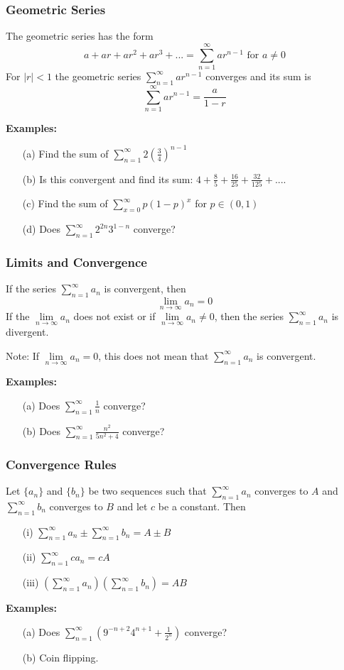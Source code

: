 \documentclass{beamer}
\begin{document}
\begin{frame}
\frametitle{Geometric Series}
The geometric series has the form
$$a + ar + ar^2 + ar^3 +... = \sum_{n=1}^\infty ar^{n-1} \mbox{ for } a\neq 0$$
For $|r|<1$ the geometric series $\sum_{n=1}^\infty ar^{n-1}$ converges and its sum is 
$$\sum_{n=1}^\infty ar^{n-1} =\frac{a}{1-r}$$

\vspace{6pt}
\textbf{Examples:}
\begin{itemize}
	\item[(a)] Find the sum of $\sum_{n=1}^\infty 2(\frac{3}{4})^{n-1}$
	\item[(b)] Is this convergent and find its sum: $4+\frac{8}{5} + \frac{16}{25} + \frac{32}{125} + ...$.
	\item[(c)] Find the sum of $\sum_{x=0}^\infty p(1-p)^x$ for $p \in (0,1)$
	\item[(d)] Does $\sum_{n=1}^\infty 2^{2n} 3^{1-n}$ converge?
\end{itemize}
\end{frame}

\begin{frame}
\frametitle{Limits and Convergence}

\begin{theorem}
	If the series $\sum_{n=1}^\infty a_n$ is convergent, then 
	$$\lim\limits_{n \to \infty} a_n = 0$$
	If the $\lim\limits_{n \to \infty} a_n$ does not exist or if $\lim\limits_{n \to \infty} a_n \neq 0$, then the series $\sum_{n=1}^\infty a_n$  is divergent.
\end{theorem}
Note: If $\lim\limits_{n\to \infty} a_n = 0$, this does not mean that $\sum_{n=1}^\infty a_n$ is convergent.

\vspace{12pt}
\textbf{Examples:}
\begin{itemize}
	\item[(a)] Does $\sum_{n=1}^\infty \frac{1}{n}$ converge?
	\item[(b)] Does $\sum_{n=1}^\infty \frac{n^2}{5n^2+4}$ converge?
\end{itemize}
\end{frame}

\begin{frame}
\frametitle{Convergence Rules}
Let $\{a_n\}$ and $\{b_n\}$ be two sequences such that $\sum_{n=1}^\infty a_n$ converges to $A$ and $\sum_{n=1}^\infty b_n$ converges to $B$ and let $c$ be a constant. Then
\begin{itemize}
	\item[(i)] $\sum_{n=1}^\infty a_n \pm  \sum_{n=1}^\infty b_n = A \pm B$
	\item[(ii)] $\sum_{n=1}^\infty c a_n = cA$
	\item[(iii)] $(\sum_{n=1}^\infty a_n )(\sum_{n=1}^\infty b_n ) = AB$
\end{itemize}
\vspace{12pt}
\textbf{Examples:}
\begin{itemize}
	\item[(a)] Does $\sum_{n=1}^{\infty} (9^{-n+2}4^{n+1} + \frac{1}{2^n})$ converge?
	\item[(b)] Coin flipping.
\end{itemize}
\end{frame}
\end{document}
